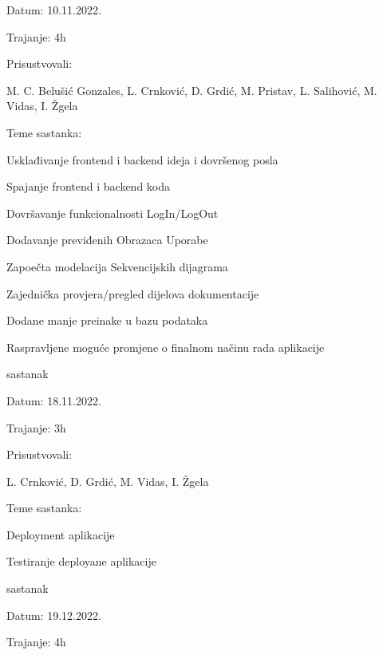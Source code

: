 \begin{packed_enum}
\item[] \begin{packed_item}
	\item Datum: 10.11.2022.
	\item Trajanje: 4h
	
	
	\item Prisustvovali: \begin{packed_enum}
		
		\item[]  M. C. Belušić Gonzales,
		L. Crnković,
		D. Grdić,
		M. Pristav,
		L. Salihović,
		M. Vidas,
		I. Žgela
	\end{packed_enum}
	\item Teme sastanka:
	\begin{packed_item}
		\item  Usklađivanje frontend i backend ideja i dovršenog posla
		\item  Spajanje frontend i backend koda
		\item  Dovršavanje funkcionalnosti LogIn/LogOut
		\item  Dodavanje previđenih Obrazaca Uporabe
		\item  Zapoečta modelacija Sekvencijskih dijagrama
		\item  Zajednička provjera/pregled dijelova dokumentacije
		\item  Dodane manje preinake u bazu podataka
		\item  Raspravljene moguće promjene o finalnom načinu rada aplikacije
	\end{packed_item}
\end{packed_item}
	\item  sastanak
\item[] \begin{packed_item}
	\item Datum: 18.11.2022.
	\item Trajanje: 3h
	
	
	\item Prisustvovali: \begin{packed_enum}
		
		\item[] 
		L. Crnković,
		D. Grdić,	
		M. Vidas,
		I. Žgela
	\end{packed_enum}
	\item Teme sastanka:
	\begin{packed_item}
		\item Deployment aplikacije
		\item Testiranje deployane aplikacije
	\end{packed_item}
\end{packed_item}
	\item  sastanak
\item[] \begin{packed_item}
	\item Datum: 19.12.2022.
	\item Trajanje: 4h
	

\end{packed_item}
\end{packed_enum}

